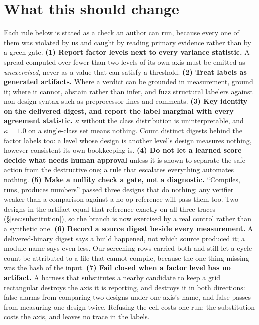 \documentclass[10pt,twocolumn]{article}
\begin{document}
\section{What this should change}
\label{sec:changes}

Each rule below is stated as a check an author can run, because every one of them was
violated by us and caught by reading primary evidence rather than by a green gate.
\textbf{(1) Report factor levels next to every variance statistic.} A spread computed
over fewer than two levels of its own axis must be emitted as \emph{unexercised}, never
as a value that can satisfy a threshold. \textbf{(2) Treat labels as generated
artifacts.} Where a verdict can be grounded in measurement, ground it; where it cannot,
abstain rather than infer, and fuzz structural labelers against non-design syntax such
as preprocessor lines and comments. \textbf{(3) Key identity on the delivered
digest, and report the label marginal with every agreement statistic.} $\kappa$ without
the class distribution is uninterpretable, and $\kappa=1.0$ on a single-class set means
nothing. Count distinct digests behind the factor labels too: a level whose design is
another level's design measures nothing, however consistent its own bookkeeping is. \textbf{(4) Do not let a learned score decide what needs human approval}
unless it is shown to separate the safe action from the destructive one; a rule that
escalates everything automates nothing. \textbf{(5) Make a nullity check a gate, not a
diagnostic.} ``Compiles, runs, produces numbers'' passed three designs that do nothing;
any verifier weaker than a comparison against a no-op reference will pass them too. Two
designs in the artifact equal that reference exactly on all three traces
(\S\ref{sec:substitution}), so the branch is now exercised by a real control rather
than a synthetic one.
\textbf{(6) Record a source digest beside every measurement.} A delivered-binary digest
says a build happened, not which source produced it; a module name says even less. Our
screening rows carried both and still let a cycle count be attributed to a file that
cannot compile, because the one thing missing was the hash of the input.
\textbf{(7) Fail closed when a factor level has no artifact.} A harness that substitutes
a nearby candidate to keep a grid rectangular destroys the axis it is reporting, and
destroys it in both directions: false alarms from comparing two designs under one
axis's name, and false passes from measuring one design twice. Refusing the cell costs one
run; the substitution costs the axis, and leaves no trace in the labels.
\end{document}
